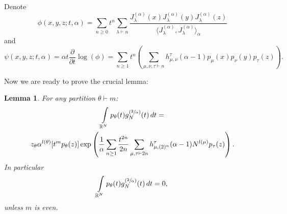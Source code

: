 \documentclass{article}
\newtheorem{lemma}{Lemma}
\newcommand{\J}{J^{(\alpha)}}
\begin{document}
    Denote
    $$
	   \phi(x, y, z; t, \alpha) = \sum\limits_{n \geq 0 }t^n\sum\limits_{\lambda \vdash n}\frac{\J_{\lambda}(x)\J_{\lambda}(y)\J_{\lambda}(z)}{\langle \J_{\lambda}, \J_{\lambda}\rangle_{\alpha}}
    $$
    and
    \begin{equation}\label{eq:psi}  
	   \psi(x, y, z; t, \alpha) = \alpha t\frac{\partial}{\partial t}\log{(\phi)} =
	   \sum\limits_{n\geq 1}t^n
	   \left(\sum\limits_{\mu, \nu, \tau \vdash n}h_{\mu, \nu}^{\tau}(\alpha - 1)p_{\mu}(x)p_{\nu}(y)p_{\tau}(z)\right).
    \end{equation}

Now we are ready to prove the crucial lemma:
\begin{lemma}\label{lemma:moments_and_h}
    For any partition $\theta \vdash m$:
    \begin{multline}
        \int\limits_{\mathbb{R}^N}p_{\theta}(t)g_N^{(\sfrac{2}{\alpha})}(t)\mathop{dt} = \\ z_{\theta}\alpha^{l(\theta)}[t^mp_{\theta}(z)]\exp\left(\frac{1}{\alpha}\sum\limits_{n \geq 1}\frac{t^{2n}}{2n}\sum\limits_{\mu, \tau \vdash 2n}h_{\mu, (2)^n}^{\tau}(\alpha - 1)N^{l(\mu)}p_{\tau}(z)\right).
      \end{multline}
    In particular
    $$
        \int\limits_{\mathbb{R}^N}p_{\theta}(t)g_N^{(\sfrac{2}{\alpha})}(t)\mathop{dt} = 0,
    $$
    unless $m$ is even.
\end{lemma}
\end{document}
